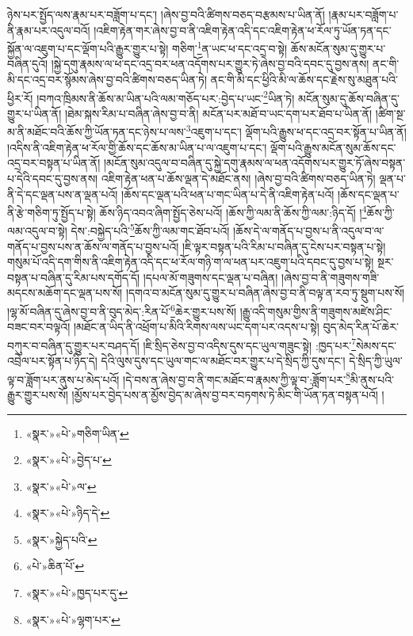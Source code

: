 ཉེས་པར་སྤྱོད་ལས་རྣམ་པར་བཟློག་པ་དང་། །ཞེས་བྱ་བའི་ཚིགས་བཅད་བརྩམས་པ་ཡིན་ནོ། །རྣམ་པར་བཟློག་པ་ནི་རྣམ་པར་འདུལ་བའོ། །འཇིག་རྟེན་གར་ཞེས་བྱ་བ་ནི་འཇིག་རྟེན་འདི་དང་འཇིག་རྟེན་ཕ་རོལ་ཏུ་ཡོན་ཏན་དང་སྐྱོན་ལ་འཇུག་པ་དང་ལྡོག་པའི་རྒྱུར་གྱུར་པ་སྟེ། གཅིག་\footnote{«སྣར་»«པེ་»གཅིག་ཡིན་}ན་ཡང་ཕ་དང་འདྲ་བ་སྟེ། ཆོས་མངོན་སུམ་དུ་གྱུར་པ་བཞིན་དུའོ། །སྐྱེ་དགུ་རྣམས་ལ་ཕ་དང་འདྲ་བར་ཕན་འདོགས་པར་གྱུར་ཏེ་ཞེས་བྱ་བའི་དབང་དུ་བྱས་ནས། ནང་གི་མི་དང་འདྲ་བར་སྙོམས་ཞེས་བྱ་བའི་ཚིགས་བཅད་ཡིན་ཏེ། ནང་གི་མི་དང་ཕྱིའི་མི་ལ་ཆོས་དང་རྗེས་སུ་མཐུན་པའི་ཕྱིར་རོ། །བཀའ་ཁྲིམས་ནི་ཆོས་མ་ཡིན་པའི་ལམ་གཅོད་པར་:བྱེད་པ་ཡང་\footnote{«སྣར་»«པེ་»བྱེད་པ་}ཡིན་ཏེ། མངོན་སུམ་དུ་ཆོས་བཞིན་དུ་གྱུར་པ་ཡིན་ནོ། །ཐེམ་སྐས་རིམ་པ་བཞིན་ཞེས་བྱ་བ་ནི། མངོན་པར་མཐོ་བ་ཡང་དག་པར་ཐོབ་པ་ཡིན་ནོ། །ཚིག་སྔ་མ་ནི་མཐོང་བའི་ཆོས་ཀྱི་ཡོན་ཏན་དང་ཉེས་པ་ལས་\footnote{«སྣར་»«པེ་»ལ་}འཇུག་པ་དང་། ལྡོག་པའི་རྒྱུས་ཕ་དང་འདྲ་བར་སྟོན་པ་ཡིན་ནོ། །འདིས་ནི་འཇིག་རྟེན་ཕ་རོལ་གྱི་ཆོས་དང་ཆོས་མ་ཡིན་པ་ལ་འཇུག་པ་དང་། ལྡོག་པའི་རྒྱུས་མངོན་སུམ་ཆོས་དང་འདྲ་བར་བསྟན་པ་ཡིན་ནོ། །མངོན་སུམ་འདུལ་བ་བཞིན་དུ་སྐྱེ་དགུ་རྣམས་ལ་ཕན་འདོགས་པར་གྱུར་ཏོ་ཞེས་བསྟན་པ་དེའི་དབང་དུ་བྱས་ནས། འཇིག་རྟེན་ཕན་པ་ཆོས་ལྡན་དེ་མཐོང་ནས། །ཞེས་བྱ་བའི་ཚིགས་བཅད་ཡིན་ཏེ། ལྡན་པ་ནི་དེ་དང་ལྡན་པས་ན་ལྡན་པའོ། །ཆོས་དང་ལྡན་པའི་ཕན་པ་གང་ཡིན་པ་དེ་ནི་འཇིག་རྟེན་པའོ། །ཆོས་དང་ལྡན་པ་ནི་རྩེ་གཅིག་ཏུ་སྤྱོད་པ་སྟེ། ཆོས་ཉིད་འབའ་ཞིག་སྤྱོད་ཅེས་པའོ། །ཆོས་ཀྱི་ལམ་ནི་ཆོས་ཀྱི་ལམ་:ཉིད་དོ། །\footnote{«སྣར་»«པེ་»ཉིད་དེ་}ཆོས་ཀྱི་ལམ་འདུལ་བ་སྟེ། དེས་:བསྐྱེད་པའི་\footnote{«སྣར་»སྐྱེད་པའི་}ཆོས་ཀྱི་ལམ་གང་ཐོབ་པའོ། །ཆོས་དེ་ལ་གནོད་པ་བྱས་པ་ནི་འདུལ་བ་ལ་གནོད་པ་བྱས་པས་ན་ཆོས་ལ་གནོད་པ་བྱས་པའོ། །ཇི་ལྟར་བསྟན་པའི་རིམ་པ་བཞིན་དུ་ངེས་པར་བསྟན་པ་སྟེ། གསུམ་པོ་འདི་དག་གིས་ནི་འཇིག་རྟེན་འདི་དང་ཕ་རོལ་གཉི་ག་ལ་ཕན་པར་འཇུག་པའི་དབང་དུ་བྱས་པ་སྟེ། སྔར་བསྟན་པ་བཞིན་དུ་རིམ་པས་དགོད་དོ། །དཔལ་མོ་གཟུགས་དང་ལྡན་པ་བཞིན། །ཞེས་བྱ་བ་ནི་གཟུགས་གཟི་མདངས་མཆོག་དང་ལྡན་པས་སོ། །དགའ་བ་མངོན་སུམ་དུ་གྱུར་པ་བཞིན་ཞེས་བྱ་བ་ནི་བལྟ་ན་རབ་ཏུ་སྡུག་པས་སོ། །ལྷ་མོ་བཞིན་དུ་ཞེས་བྱ་བ་ནི་བུད་མེད་:རིན་པོ་\footnote{«པེ་»ཆིན་པོ་}ཆེར་གྱུར་པས་སོ། །རྒྱུ་འདི་གསུམ་གྱིས་ནི་གཟུགས་མཛེས་ཤིང་བཟང་བར་བལྟའོ། །མཐོང་ན་ཡིད་ནི་འཕྲོག་པ་མིའི་རིགས་ལས་ཡང་དག་པར་འདས་པ་སྟེ། བུད་མེད་རིན་པོ་ཆེར་བཀུར་བ་བཞིན་དུ་གྱུར་པར་བཤད་དོ། །ཇི་སྲིད་ཅེས་བྱ་བ་འདིས་དུས་དང་ཡུལ་གཟུང་སྟེ། :ཁྱད་པར་\footnote{«སྣར་»«པེ་»ཁྱད་པར་དུ་}སེམས་དང་འབྲེལ་པར་སྟོན་པ་ཉིད་དེ། དེའི་ལུས་དུས་དང་ཡུལ་གང་ལ་མཐོང་བར་གྱུར་པ་དེ་སྲིད་ཀྱི་དུས་དང་། དེ་སྲིད་ཀྱི་ཡུལ་ལྟ་བ་ཟློག་པར་ནུས་པ་མེད་པའོ། །དེ་བས་ན་ཞེས་བྱ་བ་ནི་གང་མཐོང་བ་རྣམས་ཀྱི་ལྟ་བ་:ཟློག་པར་\footnote{«སྣར་»«པེ་»ལྷག་པར་}མི་ནུས་པའི་རྒྱུར་གྱུར་པས་སོ། །མྱོས་པར་བྱེད་པས་ན་མྱོས་བྱེད་མ་ཞེས་བྱ་བར་བཏགས་ཏེ་མིང་གི་ཡོན་ཏན་བསྟན་པའོ། །
